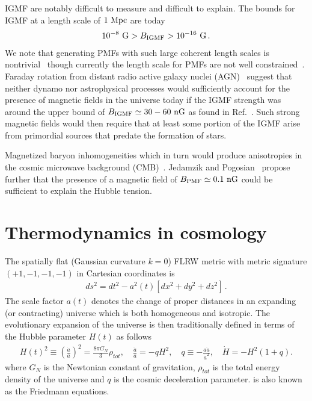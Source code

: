 IGMF are notably difficult to measure and difficult to explain. The bounds for IGMF at a length scale of $1{\rm\ Mpc}$ are today~\citep{Neronov:2010gir,Taylor:2011bn,Pshirkov:2015tua,Jedamzik:2018itu,Vernstrom:2021hru}
\begin{align}
 \label{igmf}
 10^{-8}{\rm\ G}>B_{\rm IGMF}>10^{-16}{\rm\ G}\,.
\end{align}
We note that generating PMFs with such large coherent length scales is nontrivial~\citep{Giovannini:2022rrl} though currently the length scale for PMFs are not well constrained~\citep{AlvesBatista:2021sln}. Faraday rotation from distant radio active galaxy nuclei (AGN)~\citep{Pomakov:2022cem} suggest that neither dynamo nor astrophysical processes would sufficiently account for the presence of magnetic fields in the universe today if the IGMF strength was around the upper bound of $B_{\rm IGMF}\simeq30-60{\rm\ nG}$ as found in Ref.~\citep{Vernstrom:2021hru}. Such strong magnetic fields would then require that at least some portion of the IGMF arise from primordial sources that predate the formation of stars.

Magnetized baryon inhomogeneities which in turn would produce anisotropies in the cosmic microwave background (CMB)~\cite{Jedamzik:2013gua,Abdalla:2022yfr}. Jedamzik and Pogosian~\cite{Jedamzik:2020krr} propose further that the presence of a magnetic field of $B_{\rm PMF}\simeq0.1{\rm\ nG}$ could be sufficient to explain the Hubble tension.

\section{Thermodynamics in cosmology}
\label{sec:thermo}
\noindent The spatially flat (Gaussian curvature $k=0$) FLRW metric with metric signature $(+1,-1,-1,-1)$ in Cartesian coordinates is
\begin{align}
    \label{FLRW} ds^2=dt^2-a^2(t)\left[dx^2+dy^2+dz^2\right]\,.
\end{align}
The scale factor $a(t)$ denotes the change of proper distances in an expanding (or contracting) universe which is both homogeneous and isotropic. The evolutionary expansion of the universe is then traditionally defined in terms of the Hubble parameter $H(t)$ as follows
\begin{align}
  \label{Friedmann} H(t)^{2}\equiv\left(\frac{\dot a}{a}\right)^2=\frac{8\pi G_{N}}{3}\rho_{tot},\quad \frac{\ddot a}{a}=-qH^2,\quad 
q\equiv -\frac{a\ddot a}{\dot a^2},\quad \dot H=-H^2(1+q).
\end{align}
where $G_N$ is the Newtonian constant of gravitation, $\rho_{tot}$ is the total energy density of the universe and $q$ is the cosmic deceleration parameter.  is also known as the Friedmann equations. 

